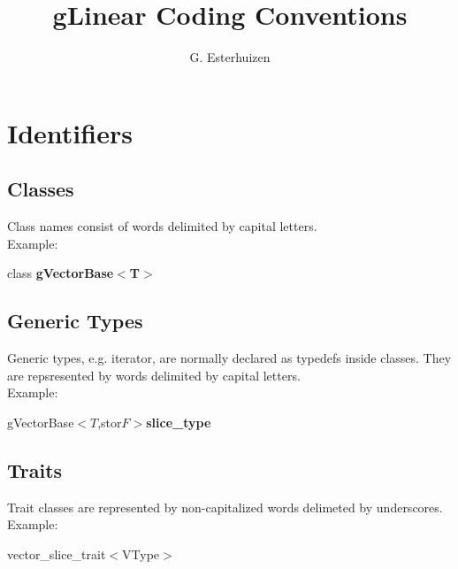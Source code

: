 \documentclass[12pt,a4paper]{article}
\begin{document}
\title{gLinear Coding Conventions}
\author{G. Esterhuizen}
\maketitle

\section{Identifiers}
\subsection{Classes}
Class names consist of words delimited by capital letters. \\
Example:
\begin{center} class \textbf{gVectorBase$<$T$>$} \end{center}

\subsection{Generic Types}
Generic types, e.g. iterator, are normally declared as typedefs inside classes.
They are repsresented by words delimited by capital letters. \\
Example:
\begin{center} gVectorBase$<T$,stor$F>$\textbf{slice\_type} \end{center}

\subsection{Traits}
Trait classes are represented by non-capitalized words delimeted by
underscores.
Example:
\begin{center} vector\_slice\_trait$<$VType$>$ \end{center}
    
\end{document}
